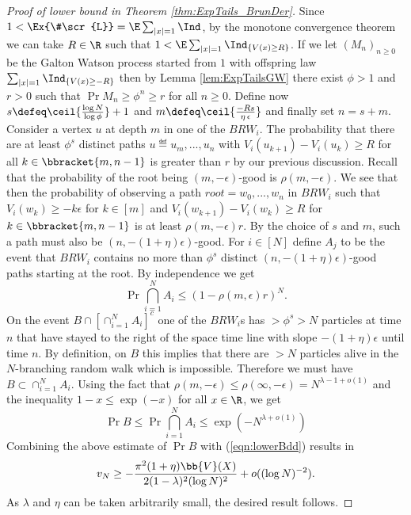 \begin{proof}[Proof of lower bound in Theorem \ref{thm:ExpTails_BrunDer}]
Since $1 < \Ex{\#\scr{L}} = \E\sum_{|x|=1} \Ind$, by the monotone convergence theorem we can take $R \in \R$ such that $1 < \E\sum_{|x|=1} \Ind_{\{ V(x) \geq R\}}$. If we let $(M_n)_{n \geq 0}$ be the Galton Watson process started from $1$ with offspring law $\sum_{|x|=1} \Ind_{\{ V(x) \geq -R\}}$ then by Lemma \ref{lem:ExpTailsGW} there exist $\phi > 1$ and $r > 0$ such that $\Pr{M_n \geq \phi^n} \geq r$ for all $n \geq 0$. Define now $s \defeq \ceil{\frac{\log N}{\log \phi}} + 1$ and $m \defeq \ceil{\frac{- Rs}{\eta\, \epsilon}}$ and finally set $n = s + m$. Consider a vertex $u$ at depth $m$ in one of the $BRW_i$. The probability that there are at least $\phi^s$ distinct paths $u \eqdef u_m, ..., u_n$ with $V_i(u_{k+1}) - V_i(u_k) \geq R$ for all $k \in \bbracket{m, n - 1}$ is greater than $r$ by our previous discussion. Recall that the probability of the root being $(m, - \epsilon)$-good is $\rho(m, - \epsilon)$. We see that then the probability of observing a path $root = w_0, ..., w_n$ in $BRW_i$ such that $V_i(w_k) \geq - k \epsilon$ for $k \in [m]$ and $V_i(w_{k+1}) - V_i(w_k) \geq R$ for $k \in \bbracket{m, n-1}$ is at least $\rho(m, - \epsilon) r$. By the choice of $s$ and $m$, such a path must also be $(n,  - (1+\eta)\epsilon)$-good. For $i \in [N]$ define $A_j$ to be the event that $BRW_i$ contains no more than $\phi^s$ distinct $(n, - (1+\eta)\epsilon)$-good paths starting at the root. By independence we get
\begin{equation}
\Pr{\bigcap\limits_{i=1}^N A_i} \leq (1 - \rho(m, \epsilon) r)^N. 
\end{equation}
On the event $B \cap [\cap_{i=1}^N A_i]^c$ one of the $BRW_i$s has $> \phi^s > N$ particles at time $n$ that have stayed to the right of the space time line with slope $ - (1 + \eta)\epsilon$ until time $n$. By definition, on $B$ this implies that there are $> N$ particles alive in the $N$-branching random walk which is impossible. Therefore we must have $B \subset \cap_{i=1}^N A_i$. Using the fact that $\rho(m, - \epsilon) \leq \rho(\infty, - \epsilon) = N^{\lambda - 1 + o(1)}$ and the inequality $1 - x \leq \exp(-x)$ for all $x \in \R$, we get
\begin{equation}\label{eqn:ExpTailsBBound}
\Pr{B} \leq \Pr{\bigcap\limits_{i=1}^N A_i} \leq \exp(-N^{\lambda + o(1)})
\end{equation}
Combining the above estimate of $\Pr{B}$ with (\ref{eqn:lowerBdd}) results in 
\begin{equation}
v_N \geq - \frac{\pi^2 (1 + \eta) \bb{V}(X)}{2 (1 - \lambda)^2(\log N)^2} + o((\log N)^{-2}). 
\end{equation} 
As $\lambda$ and $\eta$ can be taken arbitrarily small, the desired result follows. 
\end{proof}


